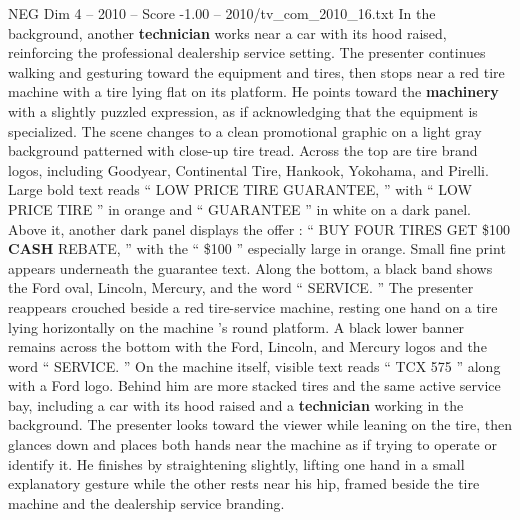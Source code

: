 \begin{textsample}{NEG Dim 4 – 2010 – Score -1.00 – 2010/tv\_com\_2010\_16.txt}
In the background, another \textbf{technician} works near a car with its hood raised, reinforcing the professional dealership service setting.
The presenter continues walking and gesturing toward the equipment and tires, then stops near a red tire machine with a tire lying flat on its platform.
He points toward the \textbf{machinery} with a slightly puzzled expression, as if acknowledging that the equipment is specialized.
The scene changes to a clean promotional graphic on a light gray background patterned with close-up tire tread.
Across the top are tire brand logos, including Goodyear, Continental Tire, Hankook, Yokohama, and Pirelli.
Large bold text reads “ LOW PRICE TIRE GUARANTEE, ” with “ LOW PRICE TIRE ” in orange and “ GUARANTEE ” in white on a dark panel.
Above it, another dark panel displays the offer : “ BUY FOUR TIRES GET \$100 \textbf{CASH} REBATE, ” with the “ \$100 ” especially large in orange.
Small fine print appears underneath the guarantee text.
Along the bottom, a black band shows the Ford oval, Lincoln, Mercury, and the word “ SERVICE. ” The presenter reappears crouched beside a red tire-service machine, resting one hand on a tire lying horizontally on the machine ’s round platform.
A black lower banner remains across the bottom with the Ford, Lincoln, and Mercury logos and the word “ SERVICE. ” On the machine itself, visible text reads “ TCX 575 ” along with a Ford logo.
Behind him are more stacked tires and the same active service bay, including a car with its hood raised and a \textbf{technician} working in the background.
The presenter looks toward the viewer while leaning on the tire, then glances down and places both hands near the machine as if trying to operate or identify it.
He finishes by straightening slightly, lifting one hand in a small explanatory gesture while the other rests near his hip, framed beside the tire machine and the dealership service branding.

\end{textsample}
